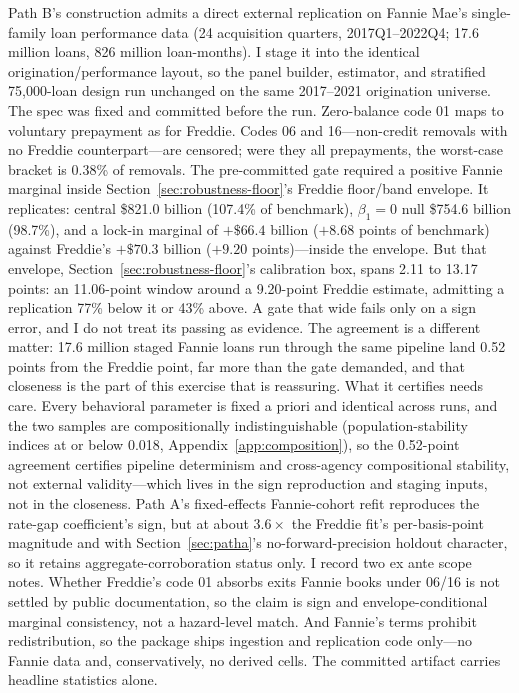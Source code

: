 \documentclass[12pt]{article}
\begin{document}
Path B's construction admits a direct external replication on Fannie Mae's single-family loan performance data (24 acquisition quarters, 2017Q1--2022Q4; 17.6 million loans, 826 million loan-months). I stage it into the identical origination/performance layout, so the panel builder, estimator, and stratified 75{,}000-loan design run unchanged on the same 2017--2021 origination universe. The spec was fixed and committed before the run. Zero-balance code 01 maps to voluntary prepayment as for Freddie. Codes 06 and 16---non-credit removals with no Freddie counterpart---are censored; were they all prepayments, the worst-case bracket is 0.38\% of removals. The pre-committed gate required a positive Fannie marginal inside Section~\ref{sec:robustness-floor}'s Freddie floor/band envelope. It replicates: central \$821.0 billion (107.4\% of benchmark), $\beta_1 = 0$ null \$754.6 billion (98.7\%), and a lock-in marginal of $+\$66.4$ billion ($+8.68$ points of benchmark) against Freddie's $+\$70.3$ billion ($+9.20$ points)---inside the envelope. But that envelope, Section~\ref{sec:robustness-floor}'s calibration box, spans 2.11 to 13.17 points: an 11.06-point window around a 9.20-point Freddie estimate, admitting a replication 77\% below it or 43\% above. A gate that wide fails only on a sign error, and I do not treat its passing as evidence. The agreement is a different matter: 17.6 million staged Fannie loans run through the same pipeline land 0.52 points from the Freddie point, far more than the gate demanded, and that closeness is the part of this exercise that is reassuring. What it certifies needs care. Every behavioral parameter is fixed a priori and identical across runs, and the two samples are compositionally indistinguishable (population-stability indices at or below 0.018, Appendix~\ref{app:composition}), so the 0.52-point agreement certifies pipeline determinism and cross-agency compositional stability, not external validity---which lives in the sign reproduction and staging inputs, not in the closeness. Path A's fixed-effects Fannie-cohort refit reproduces the rate-gap coefficient's sign, but at about $3.6\times$ the Freddie fit's per-basis-point magnitude and with Section~\ref{sec:patha}'s no-forward-precision holdout character, so it retains aggregate-corroboration status only. I record two ex ante scope notes. Whether Freddie's code 01 absorbs exits Fannie books under 06/16 is not settled by public documentation, so the claim is sign and envelope-conditional marginal consistency, not a hazard-level match. And Fannie's terms prohibit redistribution, so the package ships ingestion and replication code only---no Fannie data and, conservatively, no derived cells. The committed artifact carries headline statistics alone.
\end{document}
